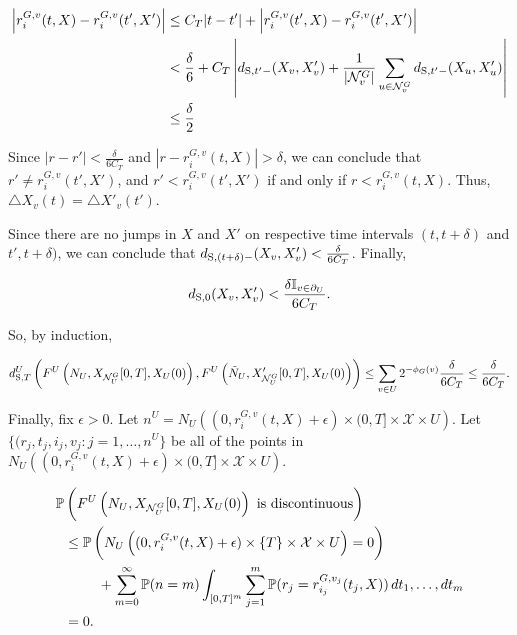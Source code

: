 \documentclass[12pt]{article}
\newcommand{\mb}{\mathbb}
\newcommand{\mc}{\mathcal}
\newcommand{\te}{\text}
\newcommand{\ep}{\epsilon}
\newcommand{\ind}{\hspace{24pt}}
\newcommand{\pr}{\mb{P}}							%
\newcommand{\sta}{\mc{X}}							%
\newcommand{\gneigh}[2]{\mc{N}^{#1}_{#2}}			%
\newcommand{\bdry}[1]{\partial_{#1}}				%
\newcommand{\Xf}{X}									%
\newcommand{\poiss}{N}								%
\newcommand{\rate}{r}								%
\newcommand{\stmet}[1]{
\ifstrempty{#1}{
	d_{\te{S}}}{
	d_{\te{S},#1}}}									%
\newcommand{\poissv}[1]{_{#1}}						%
\newcommand{\vind}[1]{_{#1}}						%
\newcommand{\tme}[1]{(#1)}							%
\newcommand{\tmi}[1]{#1}							%
\newcommand{\vpara}[1]{^{#1}}						%
\newcommand{\stpara}[1]{_{#1}}						%
\newcommand{\gvpara}[2]{^{#1,#2}}					%
\newcommand{\jumpbd}[1]{C_{#1}}						%
\newcommand{\tmepro}[2]{(#1,#2)}					%
\newcommand{\ptsnum}{n}								%
\newcommand{\alt}[1]{\tilde{#1}}					%
\renewcommand{\it}[1]{_{#1}}						%
\begin{document}
\begin{align*}
\left|\rate\gvpara{G}{v}\stpara{i}\tmepro{t}{\Xf} - \rate\gvpara{G}{v}\stpara{i}\tmepro{t'}{\Xf'}\right| &\leq \jumpbd{T}|t - t'| + \left|\rate\gvpara{G}{v}\stpara{i}\tmepro{t'}{\Xf} - \rate\gvpara{G}{v}\stpara{i}\tmepro{t'}{\Xf'}\right|\\
&< \frac{\delta}{6} + \jumpbd{T}\left|\stmet{t'-}(\Xf\vind{v},\Xf'\vind{v}) + \frac{1}{|\gneigh{G}{v}|}\sum_{u\in \gneigh{G}{v}} \stmet{t'-}(\Xf\vind{u},\Xf'\vind{u})\right|\\
&\leq \frac{\delta}{2}
\end{align*}

Since \(|r - r'| < \frac{\delta}{6\jumpbd{T}}\) and \(|r - \rate\gvpara{G}{v}\stpara{i}\tmepro{t}{\Xf}| > \delta\), we can conclude that \(r' \neq \rate\gvpara{G}{v}\stpara{i}\tmepro{t'}{\Xf'}\), and \(r' < \rate\gvpara{G}{v}\stpara{i}\tmepro{t'}{\Xf'}\) if and only if \(r < \rate\gvpara{G}{v}\stpara{i}\tmepro{t}{\Xf}\). Thus, \(\triangle \Xf\vind{v}\tme{t} = \triangle\Xf'\vind{v}\tme{t'}\).

\ind Since there are no jumps in \(\Xf\) and \(\Xf'\) on respective time intervals \((t,t+\delta)\) and \(t',t+\delta)\), we can conclude that \(\stmet{(t + \delta)-}(\Xf\vind{v},\Xf'\vind{v}) < \frac{\delta}{6\jumpbd{T}}\). Finally, 

\[\stmet{0}(\Xf\vind{v},\Xf'\vind{v}) < \frac{\delta\mb{I}_{v \in \bdry{U}}}{6\jumpbd{T}}.\]

So, by induction,

\[\stmet{T}\vpara{U}\left(F\vpara{U}\left(\poiss\poissv{U},\Xf\vind{\gneigh{G}{U}}\tmi{[0,T]},\Xf\vind{U}\tme{0}\right), F\vpara{U}\left(\alt{\poiss}\poissv{U},\Xf'\vind{\gneigh{G}{U}}\tmi{[0,T]},\Xf\vind{U}\tme{0}\right)\right) \leq \sum_{v \in U}2^{-\phi_G(v)}\frac{\delta}{6\jumpbd{T}} \leq \frac{\delta}{6\jumpbd{T}}.\]

Finally, fix \(\ep > 0\). Let \(\ptsnum\vpara{U} = \poiss\poissv{U}\left((0,\rate\gvpara{G}{v}\stpara{i}\tmepro{t}{\Xf}+\ep)\times (0,T] \times \sta \times U\right)\). Let \(\{(r\it{j},t\it{j},i\it{j},v\it{j}:j=1,\dots,\ptsnum\vpara{U}\}\) be all of the points in \(\poiss\poissv{U}\left((0,\rate\gvpara{G}{v}\stpara{i}\tmepro{t}{\Xf}+\ep)\times (0,T] \times \sta \times U\right)\).

\begin{align*}
\pr&\left(F\vpara{U}\left(\poiss\poissv{U},\Xf\vind{\gneigh{G}{U}}\tmi{[0,T]},\Xf\vind{U}\tme{0}\right)\te{ is discontinuous}\right)\\
&\leq \pr\left(\poiss\poissv{U}\left((0,\rate\gvpara{G}{v}\stpara{i}\tmepro{t}{\Xf} + \ep)\times \{T\} \times \sta\times U\right)=0\right) \\
&\hspace{24 pt}+ \sum_{m=0}^\infty \pr(\ptsnum = m)\int_{[0,T]^m} \sum_{j=1}^m \pr(r\it{j} = \rate\gvpara{G}{v\it{j}}\stpara{i\it{j}}\tmepro{t\it{j}}{\Xf})\,dt\it{1},\dots,dt\it{m}\\
&=0.
\end{align*}
\end{document}

